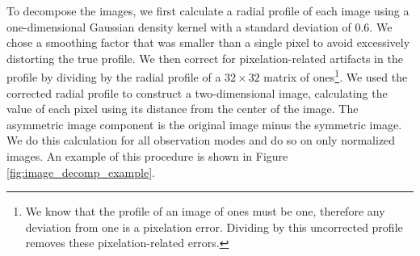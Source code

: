 To decompose the images, we first calculate a radial profile of each image using a one-dimensional Gaussian density kernel with a standard deviation of 0.6. We chose a smoothing factor that was smaller than a single pixel to avoid excessively distorting the true profile. We then correct for pixelation-related artifacts in the profile by dividing by the radial profile of a $32\times32$ matrix of ones\footnote{We know that the profile of an image of ones must be one, therefore any deviation from one is a pixelation error. Dividing by this uncorrected profile removes these pixelation-related errors.}. We used the corrected radial profile to construct a two-dimensional image, calculating the value of each pixel using its distance from the center of the image. The asymmetric image component is the original image minus the symmetric image. We do this calculation for all observation modes and do so on only normalized images. An example of this procedure is shown in Figure \ref{fig:image_decomp_example}.

